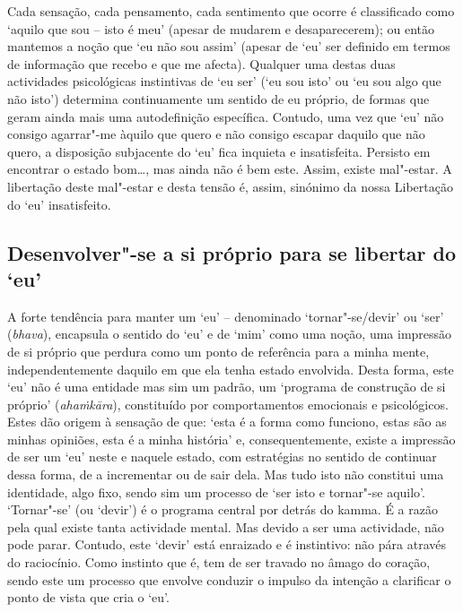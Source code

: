 Cada sensação, cada pensamento, cada sentimento que ocorre é classificado como
`aquilo que sou -- isto é meu' (apesar de mudarem e desaparecerem); ou então
mantemos a noção que `eu não sou assim' (apesar de `eu' ser definido em termos
de informação que recebo e que me afecta). Qualquer uma destas duas actividades
psicológicas instintivas de `eu ser' (`eu sou isto' ou `eu sou algo que não
isto') determina continuamente um sentido de eu próprio, de formas que geram
ainda mais uma autodefinição específica. Contudo, uma vez que `eu' não consigo
agarrar"-me àquilo que quero e não consigo escapar daquilo que não quero, a
disposição subjacente do `eu' fica inquieta e insatisfeita. Persisto em
encontrar o estado bom\ldots{}, mas ainda não é bem este. Assim, existe mal"-estar.
A libertação deste mal"-estar e desta tensão é, assim, sinónimo da nossa
Libertação do `eu' insatisfeito.

\subsection{Desenvolver"-se a si próprio para se libertar do `eu\kern -0.5pt'}

A forte tendência para manter um `eu' -- denominado `tornar"-se/devir' ou `ser'
(\emph{bhava}), encapsula o sentido do `eu' e de `mim' como uma noção, uma
impressão de si próprio que perdura como um ponto de referência para a minha
mente, independentemente daquilo em que ela tenha estado envolvida. Desta forma,
este `eu' não é uma entidade mas sim um padrão, um `programa de construção de si
próprio' (\emph{ahaṁkāra}), constituído por comportamentos emocionais e
psicológicos. Estes dão origem à sensação de que: `esta é a forma como funciono,
estas são as minhas opiniões, esta é a minha história' e, consequentemente,
existe a impressão de ser um `eu' neste e naquele estado, com estratégias no
sentido de continuar dessa forma, de a incrementar ou de sair dela. Mas tudo
isto não constitui uma identidade, algo fixo, sendo sim um processo de `ser isto
e tornar"-se aquilo'. `Tornar"-se' (ou `devir') é o programa central por detrás do
kamma. É a razão pela qual existe tanta actividade mental. Mas devido a ser uma
actividade, não pode parar. Contudo, este `devir' está enraizado e é instintivo:
não pára através do raciocínio. Como instinto que é, tem de ser travado no âmago
do coração, sendo este um processo que envolve conduzir o impulso da intenção a
clarificar o ponto de vista que cria o `eu'.

